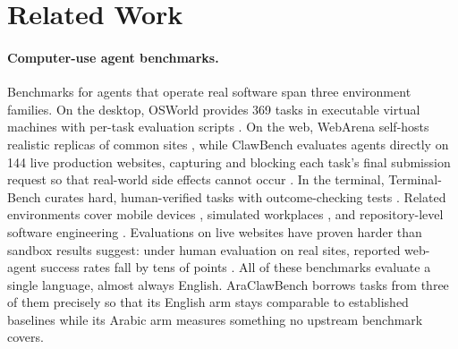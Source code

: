 \section{Related Work}
\label{sec:related}

\paragraph{Computer-use agent benchmarks.}
Benchmarks for agents that operate real software span three environment
families. On the desktop, OSWorld provides 369 tasks in executable virtual
machines with per-task evaluation scripts \citep{xie2024osworld}. On the web,
WebArena self-hosts realistic replicas of common sites \citep{zhou2024webarena},
while ClawBench evaluates agents directly on 144 live production websites,
capturing and blocking each task's final submission request so that real-world
side effects cannot occur \citep{zhang2026clawbench}. In the terminal,
Terminal-Bench curates hard, human-verified tasks with outcome-checking tests
\citep{merrill2026terminalbench}. Related environments cover mobile devices
\citep{rawles2024androidworld}, simulated workplaces \citep{xu2024agentcompany},
and repository-level software engineering \citep{jimenez2024swebench}.
Evaluations on live websites have proven harder than sandbox results suggest:
under human evaluation on real sites, reported web-agent success rates fall by
tens of points \citep{xue2025illusion}. All of these benchmarks evaluate a
single language, almost always English. AraClawBench borrows tasks from three of
them \citep{xie2024osworld, zhang2026clawbench, merrill2026terminalbench}
precisely so that its English arm stays comparable to established baselines
while its Arabic arm measures something no upstream benchmark covers.

